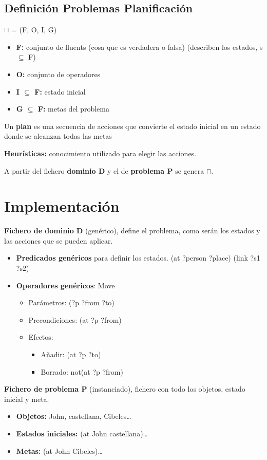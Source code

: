 \documentclass[12pt, twoside, openright]{report} %
\begin{document}
\subsection{Definición Problemas Planificación}
$\sqcap$ = (F, O, I, G)
\begin{itemize}
	\item \textbf{F:} conjunto de fluents (cosa que es verdadera o falsa) (describen los estados, s $\subseteq$ F)
	\item \textbf{O:} conjunto de operadores
	\item \textbf{I $\subseteq$ F:} estado inicial
	\item \textbf{G $\subseteq$ F:} metas del problema
\end{itemize}

Un \textbf{plan} es una secuencia de acciones que convierte el estado inicial en un estado donde se alcanzan todas las metas

\textbf{Heurísticas:} conocimiento utilizado para elegir las acciones. 

A partir del fichero \textbf{dominio D} y el de \textbf{problema P} se genera $\sqcap$.

\section{Implementación}
\textbf{Fichero de dominio D} (genérico), define el problema, como serán los estados y las acciones que se pueden aplicar.
\begin{itemize}
	\item \textbf{Predicados genéricos} para definir los estados. (at ?person ?place) (link ?s1 ?s2)
	\item \textbf{Operadores genéricos}: Move
	\begin{itemize}
		\item Parámetros: (?p ?from ?to)
		\item Precondiciones: (at ?p ?from)
		\item Efectos:
		\begin{itemize}
			\item Añadir: (at ?p ?to)
			\item Borrado: not(at ?p ?from)
		\end{itemize}
	\end{itemize}	
\end{itemize}
\pagebreak	

\textbf{Fichero de problema P} (instanciado), fichero con todo los objetos, estado inicial y meta.
\begin{itemize}
	\item \textbf{Objetos:} John, castellana, Cibeles…
	\item \textbf{Estados iniciales:} (at John castellana)…
	\item \textbf{Metas:} (at John Cibeles)…
\end{itemize}	
\end{document}

